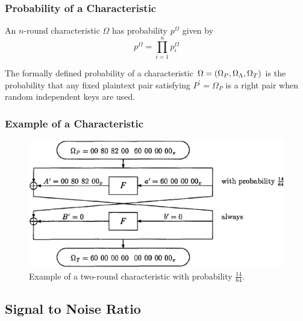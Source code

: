 \documentclass{beamer}
\begin{document}
    \begin{frame}
        \frametitle{Probability of a Characteristic}
        \begin{definition}
            An \(n\)-round characteristic \(\Omega\) has probability
            \(p^\Omega\) given by
            \begin{equation}
                p^\Omega = \prod_{i=1}^n p_i^\Omega
                \label{eq:prob-char}
            \end{equation}
        \end{definition}
        \pause
        \begin{theorem}
            The formally defined probability of a characteristic \(\Omega =
            (\Omega_P, \Omega_\Lambda, \Omega_T)\) is the probability that
            any fixed plaintext pair satisfying \(P^\prime = \Omega_P\) is a
            right pair when random independent keys are used.
        \end{theorem}
    \end{frame}

    \begin{frame}
        \frametitle{Example of a Characteristic}
        \begin{figure}[!ht]
            \centering
            \includegraphics[width=0.9\linewidth]{images/des_char.png}
            \caption{Example of a two-round characteristic with probability \(\frac{14}{64}\).}
            \label{fig:des-char-example}
        \end{figure}
    \end{frame}

    \subsection{Signal to Noise Ratio}
    \label{subsec:snr}
    
\end{document}
